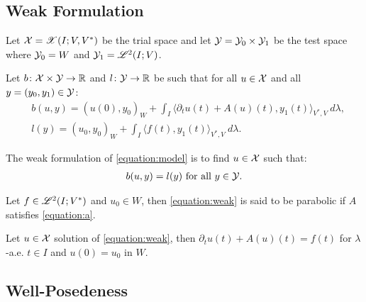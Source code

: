 \newpage
\subsection{Weak Formulation}

\begin{definition}
    Let $\mathcal{X} = \mathscr{X}(I; V, V^*)$ be the trial space and let $\mathcal{Y} = \mathcal{Y}_0 \times \mathcal{Y}_1$ be the test space where $\mathcal{Y}_0 = W$ and $\mathcal{Y}_1 = \mathscr{L}^{2}(I; V)$.
\end{definition}

\begin{definition}[$b$ and $l$]
    Let $b \colon \mathcal{X} \times \mathcal{Y} \rightarrow \mathbb{R}$ and $l \colon \mathcal{Y} \rightarrow \mathbb{R}$ be such that for all $u \in \mathcal{X}$ and all $y = (y_0, y_1) \in \mathcal{Y}$:
    \begin{align}
        & b(u, y) = \left( u(0), y_0 \right)_W + \int_I \langle \partial_t u(t) + A(u)(t), y_1(t) \rangle_{V^*, V} ~ d \lambda, \\
        & l(y) = \left( u_0, y_0 \right)_W + \int_I \langle f(t), y_1(t) \rangle_{V^*, V} ~ d \lambda.
    \end{align}
\end{definition}

\begin{definition}
    The weak formulation of \cref{equation:model} is to find $u \in \mathcal{X}$ such that:
    \begin{align}
        b(u, y) = l(y) \text{ for all } y \in \mathcal{Y}. \label{equation:weak}
    \end{align}
\end{definition}

\begin{definition}
    Let $f \in \mathscr{L}^{2}(I; V^*)$ and $u_0 \in W$, then \cref{equation:weak} is said to be parabolic if $A$ satisfies \cref{equation:a}.
\end{definition}

\begin{lemma}
    Let $u \in \mathcal{X}$ solution of \cref{equation:weak}, then $\partial_t u(t) + A(u)(t) = f(t)$ for $\lambda$-a.e. $t \in I$ and $u(0) = u_0$ in $W$.
\end{lemma}

\newpage
\subsection{Well-Posedeness}

